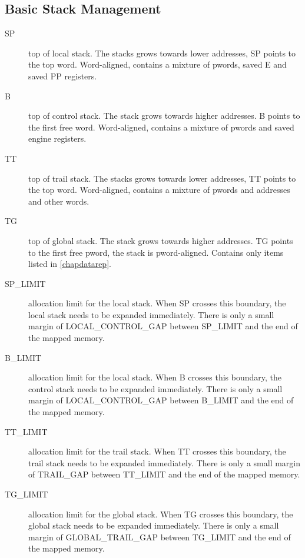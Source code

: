 \subsection{Basic Stack Management}
\begin{sloppypar}
\begin{description}
\item[SP] top of local stack. The stacks grows towards lower addresses,
        SP points to the top word. Word-aligned, contains a mixture
        of pwords, saved E and saved PP registers.
\item[B] top of control stack. The stack grows towards higher addresses.
        B points to the first free word. Word-aligned, contains a mixture
        of pwords and saved engine registers.
\item[TT] top of trail stack. The stacks grows towards lower addresses,
        TT points to the top word. Word-aligned, contains a mixture
        of pwords and addresses and other words.
\item[TG] top of global stack. The stack grows towards higher addresses.
        TG points to the first free pword, the stack is pword-aligned.
        Contains only items listed in \ref{chapdatarep}.
\item[SP_LIMIT] allocation limit for the local stack. When SP crosses this
        boundary, the local stack needs to be expanded immediately.
        There is only a small margin of LOCAL_CONTROL_GAP between SP_LIMIT
        and the end of the mapped memory.
\item[B_LIMIT] allocation limit for the local stack. When B crosses this
        boundary, the control stack needs to be expanded immediately.
        There is only a small margin of LOCAL_CONTROL_GAP between B_LIMIT
        and the end of the mapped memory.
\item[TT_LIMIT] allocation limit for the trail stack. When TT crosses this
        boundary, the trail stack needs to be expanded immediately.
        There is only a small margin of TRAIL_GAP between TT_LIMIT
        and the end of the mapped memory.
\item[TG_LIMIT]
	allocation limit for the global stack. When TG crosses this
        boundary, the global stack needs to be expanded immediately.
        There is only a small margin of GLOBAL_TRAIL_GAP between TG_LIMIT
        and the end of the mapped memory.
\end{description}
\end{sloppypar}


